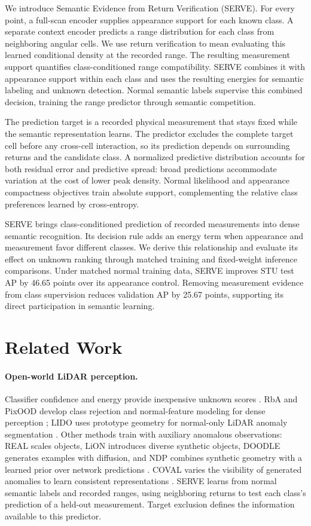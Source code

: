 \documentclass{article}
\begin{document}
We introduce Semantic Evidence from Return Verification (SERVE). For every point, a full-scan encoder supplies appearance support for each known class. A separate context encoder predicts a range distribution for each class from neighboring angular cells. We use return verification to mean evaluating this learned conditional density at the recorded range. The resulting measurement support quantifies class-conditioned range compatibility. SERVE combines it with appearance support within each class and uses the resulting energies for semantic labeling and unknown detection. Normal semantic labels supervise this combined decision, training the range predictor through semantic competition.

The prediction target is a recorded physical measurement that stays fixed while the semantic representation learns. The predictor excludes the complete target cell before any cross-cell interaction, so its prediction depends on surrounding returns and the candidate class. A normalized predictive distribution accounts for both residual error and predictive spread: broad predictions accommodate variation at the cost of lower peak density. Normal likelihood and appearance compactness objectives train absolute support, complementing the relative class preferences learned by cross-entropy.

SERVE brings class-conditioned prediction of recorded measurements into dense semantic recognition. Its decision rule adds an energy term when appearance and measurement favor different classes. We derive this relationship and evaluate its effect on unknown ranking through matched training and fixed-weight inference comparisons. Under matched normal training data, SERVE improves STU test AP by 46.65 points over its appearance control. Removing measurement evidence from class supervision reduces validation AP by 25.67 points, supporting its direct participation in semantic learning.

\section{Related Work}
\paragraph{Open-world LiDAR perception.}
Classifier confidence and energy provide inexpensive unknown scores \citep{msp,energy}. RbA and PixOOD develop class rejection and normal-feature modeling for dense perception \citep{rba,pixood}; LIDO uses prototype geometry for normal-only LiDAR anomaly segmentation \citep{lido}. Other methods train with auxiliary anomalous observations: REAL scales objects, LiON introduces diverse synthetic objects, DOODLE generates examples with diffusion, and NDP combines synthetic geometry with a learned prior over network predictions \citep{real,lion,doodle,ndp}. COVAL varies the visibility of generated anomalies to learn consistent representations \citep{coval}. SERVE learns from normal semantic labels and recorded ranges, using neighboring returns to test each class's prediction of a held-out measurement. Target exclusion defines the information available to this predictor.
\end{document}
